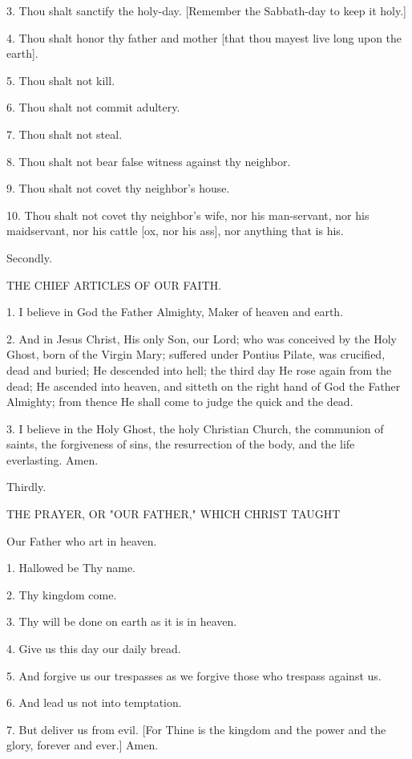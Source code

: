 3. Thou shalt sanctify the holy-day. [Remember the Sabbath-day to keep
it holy.]

4. Thou shalt honor thy father and mother [that thou mayest live long
upon the earth].

5. Thou shalt not kill.

6. Thou shalt not commit adultery.

7. Thou shalt not steal.

8. Thou shalt not bear false witness against thy neighbor.

9. Thou shalt not covet thy neighbor's house.

10. Thou shalt not covet thy neighbor's wife, nor his man-servant, nor
his maidservant, nor his cattle [ox, nor his ass], nor anything that is
his.

Secondly.

THE CHIEF ARTICLES OF OUR FAITH.


1. I believe in God the Father Almighty, Maker of heaven and earth.

2. And in Jesus Christ, His only Son, our Lord; who was conceived by
the Holy Ghost, born of the Virgin Mary; suffered under Pontius Pilate,
was crucified, dead and buried; He descended into hell; the third day
He rose again from the dead; He ascended into heaven, and sitteth on
the right hand of God the Father Almighty; from thence He shall come to
judge the quick and the dead.

3. I believe in the Holy Ghost, the holy Christian Church, the
communion of saints, the forgiveness of sins, the resurrection of the
body, and the life everlasting. Amen.


Thirdly.

THE PRAYER, OR "OUR FATHER," WHICH CHRIST TAUGHT

Our Father who art in heaven.

1. Hallowed be Thy name.

2. Thy kingdom come.

3. Thy will be done on earth as it is in heaven.

4. Give us this day our daily bread.

5. And forgive us our trespasses as we forgive those who trespass
against us.

6. And lead us not into temptation.

7. But deliver us from evil. [For Thine is the kingdom and the power
and the glory, forever and ever.] Amen.


